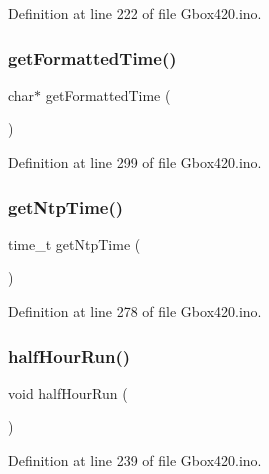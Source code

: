 Definition at line 222 of file Gbox420.\+ino.

\mbox{\label{_gbox420_8ino_a1ebe4ccb96ff35ce0b74c4afc0c597fe}} 
\subsubsection{\texorpdfstring{getFormattedTime()}{getFormattedTime()}}
{\footnotesize\ttfamily char$\ast$ get\+Formatted\+Time (\begin{DoxyParamCaption}{ }\end{DoxyParamCaption})}



Definition at line 299 of file Gbox420.\+ino.

\mbox{\label{_gbox420_8ino_a42ab384e77148282f4730ec6c68ac2a3}} 
\subsubsection{\texorpdfstring{getNtpTime()}{getNtpTime()}}
{\footnotesize\ttfamily time\+\_\+t get\+Ntp\+Time (\begin{DoxyParamCaption}{ }\end{DoxyParamCaption})}



Definition at line 278 of file Gbox420.\+ino.

\mbox{\label{_gbox420_8ino_a1ce97cb95a80a23343e3f65420163919}} 
\subsubsection{\texorpdfstring{halfHourRun()}{halfHourRun()}}
{\footnotesize\ttfamily void half\+Hour\+Run (\begin{DoxyParamCaption}{ }\end{DoxyParamCaption})}



Definition at line 239 of file Gbox420.\+ino.

\mbox{\label{_gbox420_8ino_abdcf561f5426d52892b5a1a8db3e26aa}} 
